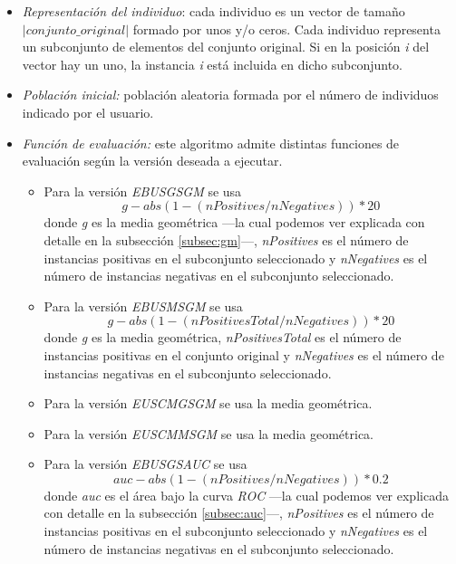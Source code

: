 \begin{itemize}
	\item \textit{Representación del individuo}: cada individuo es un vector de tamaño $\left | conjunto\_original \right |$ formado por unos y/o ceros. Cada individuo representa un subconjunto de elementos del conjunto original. Si en la posición \textit{i} del vector hay un uno, la instancia \textit{i} está incluida en dicho subconjunto.
	\item \textit{Población inicial:} población aleatoria formada por el número de individuos indicado por el usuario.
	\item \textit{Función de evaluación:} este algoritmo admite distintas funciones de evaluación según la versión deseada a ejecutar.
	\begin{itemize}
		\item Para la versión \textit{EBUSGSGM} se usa
		\begin{equation}
			g - abs(1 - (nPositives / nNegatives)) * 20
		\end{equation}
		 donde \textit{g} es la media geométrica —la cual podemos ver explicada con detalle en la subsección \ref{subsec:gm}—, \textit{nPositives} es el número de instancias positivas en el subconjunto seleccionado y \textit{nNegatives} es el número de instancias negativas en el subconjunto seleccionado.
		\item Para la versión \textit{EBUSMSGM} se usa
		\begin{equation}
			g - abs(1 - (nPositivesTotal / nNegatives)) * 20
		\end{equation}
		donde \textit{g} es la media geométrica, \textit{nPositivesTotal} es el número de instancias positivas en el conjunto original y \textit{nNegatives} es el número de instancias negativas en el subconjunto seleccionado.
		\item Para la versión \textit{EUSCMGSGM} se usa la media geométrica.
		\item Para la versión \textit{EUSCMMSGM} se usa la media geométrica.
		\item Para la versión \textit{EBUSGSAUC} se usa
		\begin{equation}
			auc - abs(1 - (nPositives / nNegatives)) * 0.2	
		\end{equation} 
		donde \textit{auc} es el área bajo la curva \textit{ROC} —la cual podemos ver explicada con detalle en la subsección \ref{subsec:auc}—, \textit{nPositives} es el número de instancias positivas en el subconjunto seleccionado y \textit{nNegatives} es el número de instancias negativas en el subconjunto seleccionado.

\end{itemize}
\end{itemize}
